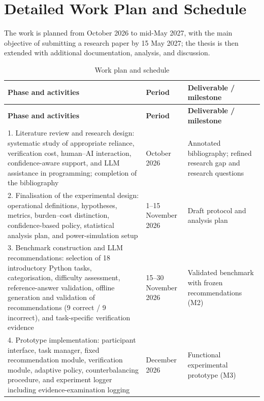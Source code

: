 \documentclass[oneside,final,14pt,a4paper]{extreport}
\begin{document}
\section{Detailed Work Plan and Schedule}
\label{sec:workplan}


The work is planned from October 2026 to mid-May 2027, with the main
objective of submitting a research paper by 15 May 2027; the thesis is then
extended with additional documentation, analysis, and discussion.


\begin{longtable}{p{8.0cm}p{2.4cm}p{5.3cm}}
\caption{Work plan and schedule}
\label{tab:workplan} \\
\toprule
\textbf{Phase and activities} & \textbf{Period} &
\textbf{Deliverable / milestone} \\
\midrule
\endfirsthead


\toprule
\textbf{Phase and activities} & \textbf{Period} &
\textbf{Deliverable / milestone} \\
\midrule
\endhead


\bottomrule
\endfoot


1. Literature review and research design:
systematic study of appropriate reliance, verification cost, human--AI
interaction, confidence-aware support, and LLM assistance in programming;
completion of the bibliography &
October 2026 &
Annotated bibliography; refined research gap and research questions \\


2. Finalisation of the experimental design:
operational definitions, hypotheses, metrics, burden--cost distinction,
confidence-based policy, statistical analysis plan, and power-simulation
setup &
1--15 November 2026 &
Draft protocol and analysis plan \\


3. Benchmark construction and LLM recommendations:
selection of 18 introductory Python tasks, categorisation, difficulty
assessment, reference-answer validation, offline generation and validation of
recommendations (9 correct / 9 incorrect), and task-specific verification
evidence &
15--30 November 2026 &
Validated benchmark with frozen recommendations (M2) \\


4. Prototype implementation:
participant interface, task manager, fixed recommendation module, verification
module, adaptive policy, counterbalancing procedure, and experiment logger
including evidence-examination logging &
December 2026 &
Functional experimental prototype (M3) \\



\end{longtable}
\end{document}
